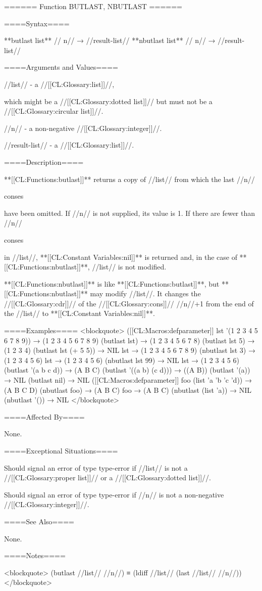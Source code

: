 ====== Function BUTLAST, NBUTLAST ======

====Syntax====

**butlast {list** //\opt} n// → //result-list// **nbutlast {list** //\opt} n// → //result-list//

====Arguments and Values====

//list// - a //[[CL:Glossary:list]]//,

which might be a //[[CL:Glossary:dotted list]]// but must not be a //[[CL:Glossary:circular list]]//.

//n// - a non-negative //[[CL:Glossary:integer]]//.

//result-list// - a //[[CL:Glossary:list]]//.

====Description====

**[[CL:Functions:butlast]]** returns a copy of //list// from which the last //n//

conses

have been omitted. If //n// is not supplied, its value is 1. If there are fewer than //n//

conses

in //list//, **[[CL:Constant Variables:nil]]** is returned and, in the case of **[[CL:Functions:nbutlast]]**, //list// is not modified.

**[[CL:Functions:nbutlast]]** is like **[[CL:Functions:butlast]]**, but **[[CL:Functions:nbutlast]]** may modify //list//. It changes the //[[CL:Glossary:cdr]]// of the //[[CL:Glossary:cons]]// //n//+1 from the end of the //list// to **[[CL:Constant Variables:nil]]**.

====Examples==== <blockquote> ([[CL:Macros:defparameter]] lst '(1 2 3 4 5 6 7 8 9)) → (1 2 3 4 5 6 7 8 9) (butlast lst) → (1 2 3 4 5 6 7 8) (butlast lst 5) → (1 2 3 4) (butlast lst (+ 5 5)) → NIL lst → (1 2 3 4 5 6 7 8 9) (nbutlast lst 3) → (1 2 3 4 5 6) lst → (1 2 3 4 5 6) (nbutlast lst 99) → NIL lst → (1 2 3 4 5 6) (butlast '(a b c d)) → (A B C) (butlast '((a b) (c d))) → ((A B)) (butlast '(a)) → NIL (butlast nil) → NIL ([[CL:Macros:defparameter]] foo (list 'a 'b 'c 'd)) → (A B C D) (nbutlast foo) → (A B C) foo → (A B C) (nbutlast (list 'a)) → NIL (nbutlast '()) → NIL </blockquote>

====Affected By====

None.

====Exceptional Situations====

Should signal an error of type type-error if //list// is not a //[[CL:Glossary:proper list]]// or a //[[CL:Glossary:dotted list]]//.

Should signal an error of type type-error if //n// is not a non-negative //[[CL:Glossary:integer]]//.

====See Also====

None.

====Notes====

<blockquote> (butlast //list// //n//) ≡ (ldiff //list// (last //list// //n//)) </blockquote>



      
